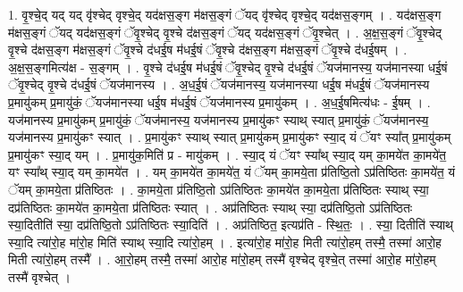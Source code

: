 \documentclass[17pt]{extarticle}
\begin{document}
1. वृ॒श्चे॒द् यद् यद् वृ॑श्चेद् वृश्चे॒द् यद॑क्षस॒ङ्ग म॑क्षस॒ङ्गं ॅयद् वृ॑श्चेद् वृश्चे॒द् यद॑क्षस॒ङ्गम् । . यद॑क्षस॒ङ्ग म॑क्षस॒ङ्गं ॅयद् यद॑क्षस॒ङ्गं ॅवृ॒श्चेद् वृ॒श्चे द॑क्षस॒ङ्गं ॅयद् यद॑क्षस॒ङ्गं ॅवृ॒श्चेत् । . अ॒क्ष॒स॒ङ्गं ॅवृ॒श्चेद् वृ॒श्चे द॑क्षस॒ङ्ग म॑क्षस॒ङ्गं ॅवृ॒श्चे द॑धई॒ष म॑धई॒षं ॅवृ॒श्चे द॑क्षस॒ङ्ग म॑क्षस॒ङ्गं ॅवृ॒श्चे द॑धई॒षम् । . अ॒क्ष॒स॒ङ्गमित्य॑क्ष - स॒ङ्गम् । . वृ॒श्चे द॑धई॒ष म॑धई॒षं ॅवृ॒श्चेद् वृ॒श्चे द॑धई॒षं ॅयज॑मानस्य॒ यज॑मानस्या धई॒षं ॅवृ॒श्चेद् वृ॒श्चे द॑धई॒षं ॅयज॑मानस्य । . अ॒ध॒ई॒षं ॅयज॑मानस्य॒ यज॑मानस्या धई॒ष म॑धई॒षं ॅयज॑मानस्य प्र॒मायु॑कम् प्र॒मायु॑कं॒ ॅयज॑मानस्या धई॒ष म॑धई॒षं ॅयज॑मानस्य प्र॒मायु॑कम् । . अ॒ध॒ई॒षमित्य॑धः - ई॒षम् । . यज॑मानस्य प्र॒मायु॑कम् प्र॒मायु॑कं॒ ॅयज॑मानस्य॒ यज॑मानस्य प्र॒मायु॑कꣳ स्याथ् स्यात् प्र॒मायु॑कं॒ ॅयज॑मानस्य॒ यज॑मानस्य प्र॒मायु॑कꣳ स्यात् । . प्र॒मायु॑कꣳ स्याथ् स्यात् प्र॒मायु॑कम् प्र॒मायु॑कꣳ स्या॒द् यं ॅयꣳ स्या᳚त् प्र॒मायु॑कम् प्र॒मायु॑कꣳ स्या॒द् यम् । . प्र॒मायु॑क॒मिति॑ प्र - मायु॑कम् । . स्या॒द् यं ॅयꣳ स्या᳚थ् स्या॒द् यम् का॒मये॑त का॒मये॑त॒ यꣳ स्या᳚थ् स्या॒द् यम् का॒मये॑त । . यम् का॒मये॑त का॒मये॑त॒ यं ॅयम् का॒मये॒ता प्र॑तिष्ठि॒तो ऽप्र॑तिष्ठितः का॒मये॑त॒ यं ॅयम् का॒मये॒ता प्र॑तिष्ठितः । . का॒मये॒ता प्र॑तिष्ठि॒तो ऽप्र॑तिष्ठितः का॒मये॑त का॒मये॒ता प्र॑तिष्ठितः स्याथ् स्या॒ दप्र॑तिष्ठितः का॒मये॑त का॒मये॒ता प्र॑तिष्ठितः स्यात् । . अप्र॑तिष्ठितः स्याथ् स्या॒ दप्र॑तिष्ठि॒तो ऽप्र॑तिष्ठितः स्या॒दितीति॑ स्या॒ दप्र॑तिष्ठि॒तो ऽप्र॑तिष्ठितः स्या॒दिति॑ । . अप्र॑तिष्ठित॒ इत्यप्र॑ति - स्थि॒तः॒ । . स्या॒ दितीति॑ स्याथ् स्या॒दि त्या॑रो॒ह मा॑रो॒ह मिति॑ स्याथ् स्या॒दि त्या॑रो॒हम् । . इत्या॑रो॒ह मा॑रो॒ह मिती त्या॑रो॒हम् तस्मै॒ तस्मा॑ आरो॒ह मिती त्या॑रो॒हम् तस्मै᳚ । . आ॒रो॒हम् तस्मै॒ तस्मा॑ आरो॒ह मा॑रो॒हम् तस्मै॑ वृश्चेद् वृश्चे॒त् तस्मा॑ आरो॒ह मा॑रो॒हम् तस्मै॑ वृश्चेत् । \newline
\end{document}
